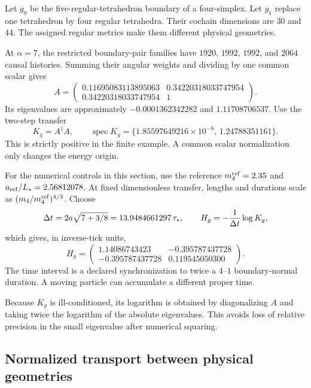 Let $g_0$ be the five-regular-tetrahedron boundary of a four-simplex. Let $g_1$ replace one tetrahedron by four regular tetrahedra. Their cochain dimensions are $30$ and $44$. The assigned regular metrics make them different physical geometries.

At $\alpha=7$, the restricted boundary-pair families have $1920$, $1992$, $1992$, and $2064$ causal histories. Summing their angular weights and dividing by one common scalar gives
\begin{equation}
A=
\begin{pmatrix}
0.11695083113895063&0.34220318033747954\\
0.34220318033747954&1
\end{pmatrix}.
\end{equation}
Its eigenvalues are approximately $-0.0001362342282$ and $1.11708706537$. Use the two-step transfer
\begin{equation}
K_g=A^\dagger A,\qquad
\operatorname{spec}K_g=
\{1.85597649216\times10^{-8},\,1.24788351161\}.
\end{equation}
This is strictly positive in the finite example. A common scalar normalization only changes the energy origin.

For the numerical controls in this section, use the reference
$m_4^{\rm ref}=2.35$ and $a_{\rm ref}/L_*=2.56812078$.
At fixed dimensionless transfer, lengths and durations scale as
$(m_4/m_4^{\rm ref})^{4/3}$. Choose
\begin{equation}
\Delta t=2a\sqrt{7+3/8}
=13.9484661297\,\tau_*,\qquad
H_g=-\frac1{\Delta t}\log K_g,
\end{equation}
which gives, in inverse-tick units,
\begin{equation}
H_g=
\begin{pmatrix}
1.14086743423&-0.395787437728\\
-0.395787437728&0.119545050300
\end{pmatrix}.
\label{eq:Hgeo}
\end{equation}
The time interval is a declared synchronization to twice a $4$--$1$ boundary-normal duration. A moving particle can accumulate a different proper time.

Because $K_g$ is ill-conditioned, its logarithm is obtained by diagonalizing $A$ and taking twice the logarithm of the absolute eigenvalues. This avoids loss of relative precision in the small eigenvalue after numerical squaring.

\subsection{Normalized transport between physical geometries}

